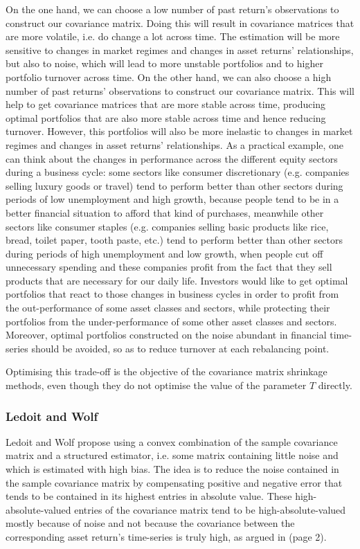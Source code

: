 	On the one hand, we can choose a low number of past return's observations to construct our covariance matrix. Doing this will result in covariance matrices that are more volatile, i.e. do change a lot across time. The estimation will be more sensitive to changes in market regimes and changes in asset returns' relationships, but also to noise, which will lead to more unstable portfolios and to higher portfolio turnover across time. On the other hand, we can also choose a high number of past returns' observations to construct our covariance matrix. This will help to get covariance matrices that are more stable across time, producing optimal portfolios that are also more stable across time and hence reducing turnover. However, this portfolios will also be more inelastic to changes in market regimes and changes in asset returns' relationships. As a practical example, one can think about the changes in performance across the different equity sectors during a business cycle: some sectors like consumer discretionary (e.g. companies selling luxury goods or travel) tend to perform better than other sectors during periods of low unemployment and high growth, because people tend to be in a better financial situation to afford that kind of purchases, meanwhile other sectors like consumer staples (e.g. companies selling basic products like rice, bread, toilet paper, tooth paste, etc.) tend to perform better than other sectors during periods of high unemployment and low growth, when people cut off unnecessary spending and these companies profit from the fact that they sell products that are necessary for our daily life. Investors would like to get optimal portfolios that react to those changes in business cycles in order to profit from the out-performance of some asset classes and sectors, while protecting their portfolios from the under-performance of some other asset classes and sectors. Moreover, optimal portfolios constructed on the noise abundant in financial time-series should be avoided, so as to reduce turnover at each rebalancing point.
	
	Optimising this trade-off is the objective of the covariance matrix shrinkage methods, even though they do not optimise the value of the parameter $T$ directly.
	
	\subsubsection{Ledoit and Wolf}\label{section:LedoitWolf}
	    Ledoit and Wolf propose using a convex combination of the sample covariance matrix and a structured estimator, i.e. some matrix containing little noise and which is estimated with high bias. The idea is to reduce the noise contained in the sample covariance matrix by compensating positive and negative error that tends to be contained in its highest entries in absolute value. These high-absolute-valued entries of the covariance matrix tend to be high-absolute-valued mostly because of noise and not because the covariance between the corresponding asset return's time-series is truly high, as argued in \cite{ledoit} (page 2).
    	
